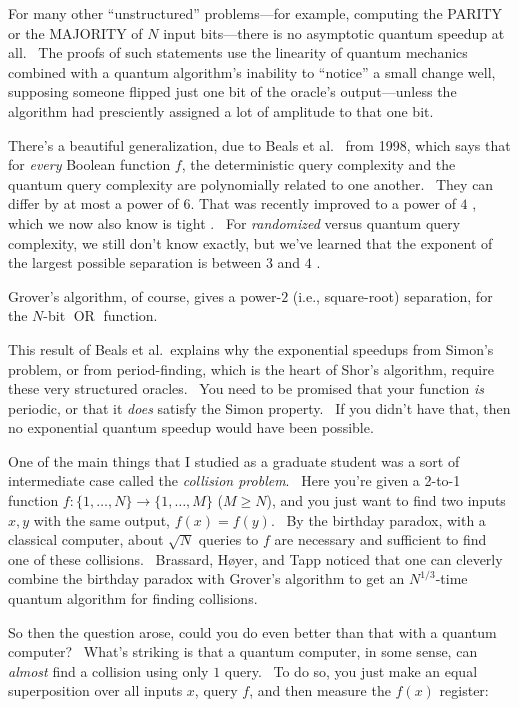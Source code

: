 \documentclass[11pt]{article}
\begin{document}
For many other ``unstructured'' problems---for example, computing the PARITY or the MAJORITY of $N$ input bits---there is no asymptotic quantum speedup at all. \ The proofs of such statements use the linearity of quantum mechanics combined with a quantum algorithm's inability to ``notice'' a small change well, supposing someone flipped just one bit of the oracle's output---unless the algorithm had presciently assigned a lot of amplitude to that one bit.

There's a beautiful generalization, due to Beals et al.\ \cite{bbcmw} from 1998, which says that for \emph{every} Boolean function $f$, the deterministic query complexity and the quantum query complexity are polynomially related to one another. \ They can differ by at most a power of $6$.  That was recently improved to a power of $4$ \cite{abkrt}, which we now also know is tight \cite{abblss}. \ For \emph{randomized} versus quantum query complexity, we still don't know exactly, but we've learned that the exponent of the largest possible separation is between $3$ and $4$ \cite{bansalsinha,sherstovsw}.

Grover's algorithm, of course, gives a power-$2$ (i.e., square-root) separation, for the $N$-bit $\operatorname{OR}$ function.

This result of Beals et al.\ explains why the exponential speedups from Simon's problem, or from period-finding, which is the heart of Shor's algorithm, require these very structured oracles. \ You need to be promised that your function \emph{is} periodic, or that it \emph{does} satisfy the Simon property. \ If you didn't have that, then no exponential quantum speedup would have been possible.

One of the main things that I studied as a graduate student was a sort of intermediate case called the \emph{collision problem}. \ Here you're given a 2-to-1 function $f:\{1,\ldots,N\}\rightarrow \{1,\ldots,M\}$ ($M\ge N$), and you just want to find two inputs $x,y$ with the same output, $f(x)=f(y)$. \ By the birthday paradox, with a classical computer, about $\sqrt{N}$ queries to $f$ are necessary and sufficient to find one of these collisions. \ Brassard, H{\o}yer, and Tapp \cite{bht} noticed that one can cleverly combine the birthday paradox with Grover's algorithm to get an $N^{1/3}$-time quantum algorithm for finding collisions.

So then the question arose, could you do even better than that with a quantum computer? \ What's striking is that a quantum computer, in some sense, can \emph{almost} find a collision using only $1$ query. \ To do so, you just make an equal superposition over all inputs $x$, query $f$, and then measure the $f(x)$ register:
\end{document}
